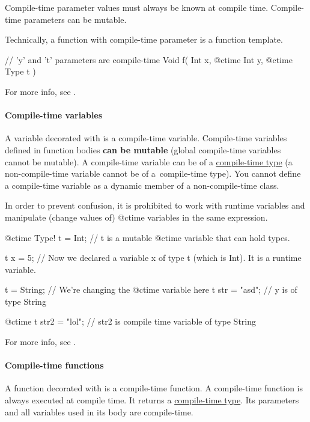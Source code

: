 Compile-time parameter values must always be known at compile time. Compile-time parameters can be mutable.

Technically, a function with compile-time parameter is a function template.

\begin{code}
// 'y' and 't' parameters are compile-time
Void f( Int x, @ctime Int y, @ctime Type t ) {
	
}
\end{code}

For more info, see .

\paragraph{Compile-time variables}
A variable decorated with  is a compile-time variable. Compile-time variables defined in function bodies \textbf{can be mutable} (global compile-time variables cannot be mutable). A compile-time variable can be of a \hyperref[ctime:class]{compile-time type} (a non-compile-time variable cannot be of a~compile-time type). You cannot define a compile-time variable as a dynamic member of a non-compile-time class.

In order to prevent confusion, it is prohibited to work with runtime variables and manipulate (change values of) @ctime variables in the same expression.

\begin{code}
@ctime Type! t = Int; // t is a mutable @ctime variable that can hold types.

t x = 5; // Now we declared a variable x of type t (which is Int). It is a runtime variable.

t = String; // We're changing the @ctime variable here
t str = "asd"; // y is of type String

@ctime t str2 = "lol"; // str2 is compile time variable of type String
\end{code}

For more info, see .

\paragraph{Compile-time functions}
A function decorated with  is a compile-time function. A compile-time function is always executed at compile time. It returns a \hyperref[ctime:class]{compile-time type}. Its parameters and all variables used in its body are compile-time.

